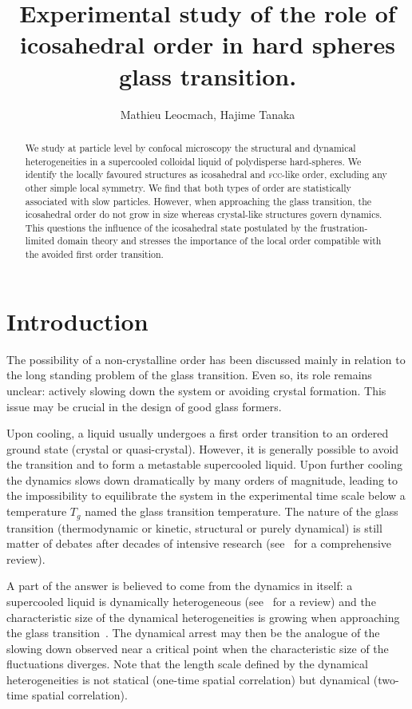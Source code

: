 \documentclass[11pt,a4paper]{article}
\title{Experimental study of the role of icosahedral order in hard spheres glass transition.}
\author{Mathieu Leocmach, Hajime Tanaka}
\begin{document}
\maketitle

\begin{abstract}
We study at particle level by confocal microscopy the structural and dynamical heterogeneities in a supercooled colloidal liquid of polydisperse hard-spheres. We identify the locally favoured structures as icosahedral and \textsc{fcc}-like order, excluding any other simple local symmetry. We find that both types of order are statistically associated with slow particles. However, when approaching the glass transition, the icosahedral order do not grow in size whereas crystal-like structures govern dynamics. This questions the influence of the icosahedral state postulated by the frustration-limited domain theory and stresses the importance of the local order compatible with the avoided first order transition.
\end{abstract}

\section*{Introduction}

The possibility of a non-crystalline order has been discussed mainly in relation to the long standing problem of the glass transition. Even so, its role remains unclear: actively slowing down the system or avoiding crystal formation. This issue may be crucial in the design of good glass formers.

Upon cooling, a liquid usually undergoes a first order transition to an ordered ground state (crystal or quasi-crystal). However, it is generally possible to avoid the transition and to form a metastable supercooled liquid. Upon further cooling the dynamics slows down dramatically by many orders of magnitude, leading to the impossibility to equilibrate the system in the experimental time scale below a temperature $T_g$ named the glass transition temperature. The nature of the glass transition (thermodynamic or kinetic, structural or purely dynamical) is still matter of debates after decades of intensive research (see~\citep{cavagna2009supercooled} for a comprehensive review).

A part of the answer is believed to come from the dynamics in itself: a supercooled liquid is dynamically heterogeneous (see~\citep{Berthier2011} for a review) and the characteristic size of the dynamical heterogeneities is growing when approaching the glass transition~\citep{Donati1999, Berthier2005}. The dynamical arrest may then be the analogue of the slowing down observed near a critical point when the characteristic size of the fluctuations diverges. Note that the length scale defined by the dynamical heterogeneities is not statical (one-time spatial correlation) but dynamical (two-time spatial correlation). 
\end{document}
